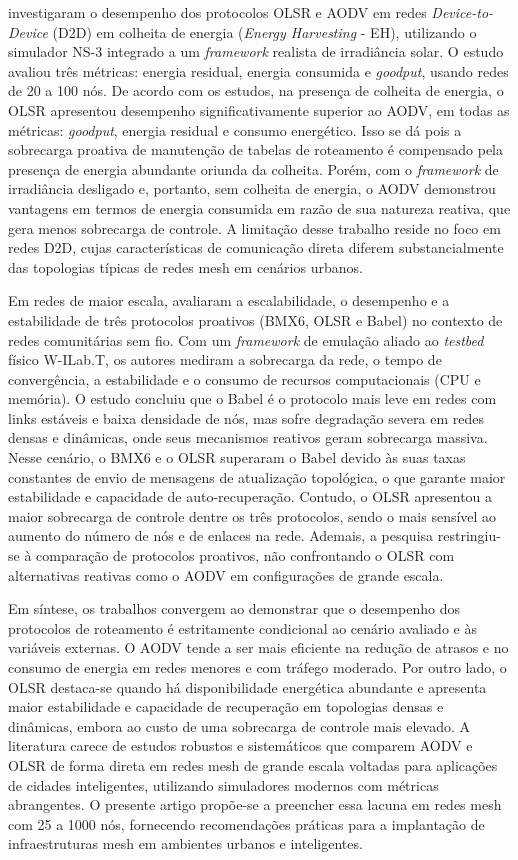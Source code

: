 \documentclass[12pt]{article}
\begin{document}
\cite{riaz2020} investigaram o desempenho dos protocolos OLSR e AODV em redes \textit{Device-to-Device} (D2D) em colheita de energia (\textit{Energy Harvesting} - EH), utilizando o simulador NS-3 integrado a um \textit{framework} realista de irradiância solar. O estudo avaliou três métricas: energia residual, energia consumida e \textit{goodput}, usando redes de 20 a 100 nós. De acordo com os estudos, na presença de colheita de energia, o OLSR apresentou desempenho significativamente superior ao AODV, em todas as métricas: \textit{goodput}, energia residual e consumo energético. Isso se dá pois a sobrecarga proativa de manutenção de tabelas de roteamento é compensado pela presença de energia abundante oriunda da colheita. Porém, com o \textit{framework} de irradiância desligado e, portanto, sem colheita de energia, o AODV demonstrou vantagens em termos de energia consumida em razão de sua natureza reativa, que gera menos sobrecarga de controle. A limitação desse trabalho reside no foco em redes D2D, cujas características de comunicação direta diferem substancialmente das topologias típicas de redes mesh em cenários urbanos.

Em redes de maior escala, \cite{neumann2015} avaliaram a escalabilidade, o desempenho e a estabilidade de três protocolos proativos (BMX6, OLSR e Babel) no contexto de redes comunitárias sem fio. Com um \textit{framework} de emulação aliado ao \textit{testbed} físico W-ILab.T, os autores mediram a sobrecarga da rede, o tempo de convergência, a estabilidade e o consumo de recursos computacionais (CPU e memória). O estudo concluiu que o Babel é o protocolo mais leve em redes com links estáveis e baixa densidade de nós, mas sofre degradação severa em redes densas e dinâmicas, onde seus mecanismos reativos geram sobrecarga massiva. Nesse cenário, o BMX6 e o OLSR superaram o Babel devido às suas taxas constantes de envio de mensagens de atualização topológica, o que garante maior estabilidade e capacidade de auto-recuperação. Contudo, o OLSR apresentou a maior sobrecarga de controle dentre os três protocolos, sendo o mais sensível ao aumento do número de nós e de enlaces na rede. Ademais, a pesquisa restringiu-se à comparação de protocolos proativos, não confrontando o OLSR com alternativas reativas como o AODV em configurações de grande escala.

Em síntese, os trabalhos convergem ao demonstrar que o desempenho dos protocolos de roteamento é estritamente condicional ao cenário avaliado e às variáveis externas. O AODV tende a ser mais eficiente na redução de atrasos e no consumo de energia em redes menores e com tráfego moderado. Por outro lado, o OLSR destaca-se quando há disponibilidade energética abundante e apresenta maior estabilidade e capacidade de recuperação em topologias densas e dinâmicas, embora ao custo de uma sobrecarga de controle mais elevado. A literatura carece de estudos robustos e sistemáticos que comparem AODV e OLSR de forma direta em redes mesh de grande escala voltadas para aplicações de cidades inteligentes, utilizando simuladores modernos com métricas abrangentes. O presente artigo propõe-se a preencher essa lacuna em redes mesh com 25 a 1000 nós, fornecendo recomendações práticas para a implantação de infraestruturas mesh em ambientes urbanos e inteligentes.
\end{document}
